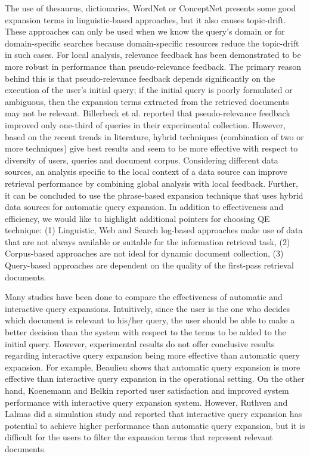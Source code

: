 The use of thesaurus, dictionaries, WordNet or ConceptNet presents some good expansion terms in linguistic-based approaches, but it also causes topic-drift. These approaches can only be used when we know the query's domain or for domain-specific searches because domain-specific resources reduce the topic-drift in such cases. For local analysis, relevance feedback has been demonstrated to be more robust in performance than pseudo-relevance feedback. The primary reason behind this is that pseudo-relevance feedback depends significantly on the execution of the user's initial query; if the initial query is poorly formulated or ambiguous, then the expansion terms extracted from the retrieved documents may not be relevant. Billerbeck et al. \cite{billerbeck2004questioning} reported that pseudo-relevance feedback improved only one-third of queries in their experimental collection. However, based on the recent trends in literature, hybrid techniques (combination of two or more techniques) give best results and seem to be more effective with respect to diversity of users, queries and document corpus. Considering different data sources, an analysis specific to the  local context of a data source can improve retrieval performance by combining global analysis with local feedback. Further, it can be concluded to use the phrase-based expansion technique that uses hybrid data sources for automatic query expansion. In addition to effectiveness and efficiency, we would like to highlight additional pointers for choosing QE technique: (1) Linguistic, Web and Search log-based approaches make use of data that are not always available or suitable for the information retrieval task, (2) Corpus-based approaches are not ideal for dynamic document collection, (3) Query-based approaches are dependent on the quality of the first-pass retrieval documents.

Many studies \cite{koenemann1996case,beaulieu1997experiments,ruthven2003survey} have been done to compare the effectiveness of automatic and interactive query expansions. Intuitively, since the user is the one who decides which document is relevant to his/her query, the user should be able to make a better decision than the system with respect to the terms to be added to the initial query. However, experimental results do not offer conclusive results regarding interactive query expansion being more effective than automatic query expansion. For example, Beaulieu \cite{beaulieu1997experiments} shows that automatic query expansion is more effective than interactive query expansion in the operational setting. On the other hand, Koenemann and Belkin \cite{koenemann1996case} reported user satisfaction and improved system performance with interactive query expansion system. However, Ruthven and Lalmas \cite{ruthven2003survey} did a simulation study and reported that interactive query expansion has potential to achieve higher performance than automatic query expansion, but it is difficult for the users to filter the expansion terms that represent relevant documents.

